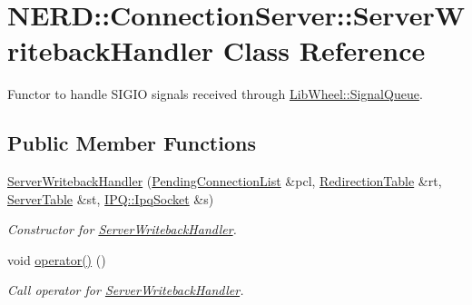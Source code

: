 \hypertarget{classNERD_1_1ConnectionServer_1_1ServerWritebackHandler}{
\section{\-N\-E\-R\-D\-:\-:\-Connection\-Server\-:\-:\-Server\-Writeback\-Handler \-Class \-Reference}
\label{classNERD_1_1ConnectionServer_1_1ServerWritebackHandler}
}


\-Functor to handle \-S\-I\-G\-I\-O signals received through \hyperlink{classLibWheel_1_1SignalQueue}{\-Lib\-Wheel\-::\-Signal\-Queue}.  


\subsection*{\-Public \-Member \-Functions}
\begin{DoxyCompactItemize}
\item 
\hyperlink{classNERD_1_1ConnectionServer_1_1ServerWritebackHandler_ab92b47891071f80818d7bde25cae902c}{\-Server\-Writeback\-Handler} (\hyperlink{classNERD_1_1ConnectionServer_ac838d247f33cef856ae722343a8cb7ff}{\-Pending\-Connection\-List} \&pcl, \hyperlink{classNERD_1_1ConnectionServer_a1f7b6abdda0f0a7a027a5f2e24727cee}{\-Redirection\-Table} \&rt, \hyperlink{classNERD_1_1ConnectionServer_a0cd661f2a6755c501ac198229675ad4d}{\-Server\-Table} \&st, \hyperlink{classIPQ_1_1IpqSocket}{\-I\-P\-Q\-::\-Ipq\-Socket} \&s)
\begin{DoxyCompactList}\small\item\em \-Constructor for \hyperlink{classNERD_1_1ConnectionServer_1_1ServerWritebackHandler}{\-Server\-Writeback\-Handler}. \end{DoxyCompactList}\item 
void \hyperlink{classNERD_1_1ConnectionServer_1_1ServerWritebackHandler_addc9ae778c4e9375c4499dab4eef2074}{operator()} ()
\begin{DoxyCompactList}\small\item\em \-Call operator for \hyperlink{classNERD_1_1ConnectionServer_1_1ServerWritebackHandler}{\-Server\-Writeback\-Handler}. \end{DoxyCompactList}\end{DoxyCompactItemize}
